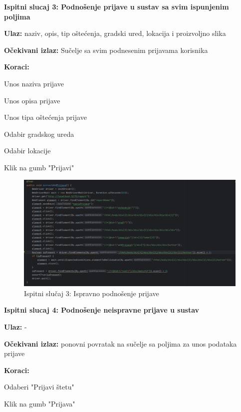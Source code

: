 		\textbf{Ispitni slucaj 3: Podnošenje prijave u sustav sa svim ispunjenim poljima}
			 \begin{packed_item}
				\item \textbf{Ulaz:} naziv, opis, tip oštećenja, gradski ured, lokacija i proizvoljno slika
				\item \textbf{Očekivani izlaz:} Sučelje sa svim podnesenim prijavama korisnika
				\item \textbf{Koraci:}
						\begin{packed_enum}
							\item Unos naziva prijave
							\item Unos opisa prijave
							\item Unos tipa oštećenja prijave
							\item Odabir gradskog ureda
							\item Odabir lokacije
							\item Klik na gumb "Prijavi"
						\end{packed_enum}
			\end{packed_item}
			
			
			\begin{figure}[H]
			\includegraphics[scale=0.4]{slike/ispravnaPrijava.PNG} %
			\centering
			\caption{Ispitni slučaj 3: Ispravno podnošenje prijave}
			\label{fig:implementacija}
		\end{figure}
		
		\textbf{Ispitni slucaj 4: Podnošenje neispravne prijave u sustav}
			 \begin{packed_item}
				\item \textbf{Ulaz:} -
				\item \textbf{Očekivani izlaz:} ponovni povratak na sučelje sa poljima za unos podataka prijave
				\item \textbf{Koraci:}
						\begin{packed_enum}
							\item Odaberi "Prijavi štetu"
							\item Klik na gumb "Prijava"
						\end{packed_enum}
			\end{packed_item}
			
